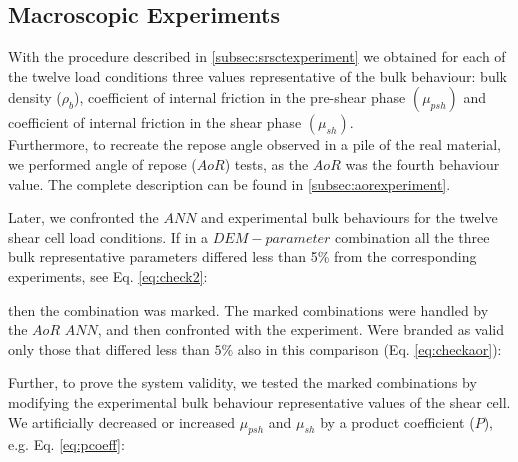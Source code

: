 \subsection{Macroscopic Experiments}
\label{subsec:macroscopicexperiments}
With the procedure described in \ref{subsec:srsctexperiment} we
obtained for each of the twelve load conditions three values representative of the bulk behaviour: bulk density ($\rho_b$),
coefficient of internal friction in the pre-shear phase $ (\mu_{psh})$ and
coefficient of internal friction in the shear phase  $ (\mu_{sh})$.\\
Furthermore, to recreate the repose angle observed in a pile of the real material, 
we performed angle of repose ($AoR$) tests, as the $AoR$ was the fourth
behaviour value. The complete description can be found in
\ref{subsec:aorexperiment}.

Later, we confronted the $ANN$ and experimental bulk behaviours for the twelve shear cell load conditions. 
If in a $DEM-parameter$ combination all the three bulk representative parameters differed less 
than 5\% from the corresponding experiments, see Eq. \ref{eq:check2}:

then the combination was marked. The marked combinations were handled by the
$AoR$ $ANN$, and then confronted with the experiment.
Were branded as valid only those that differed less than $5\%$ also in this
comparison (Eq. \ref{eq:checkaor}):

Further, to prove the system validity, we tested the marked combinations by
modifying the experimental bulk behaviour representative values of the shear cell. 
We artificially decreased or increased $\mu_{psh}$ and $\mu_{sh}$ by a product
coefficient ($P$), e.g. Eq. \ref{eq:pcoeff}:




